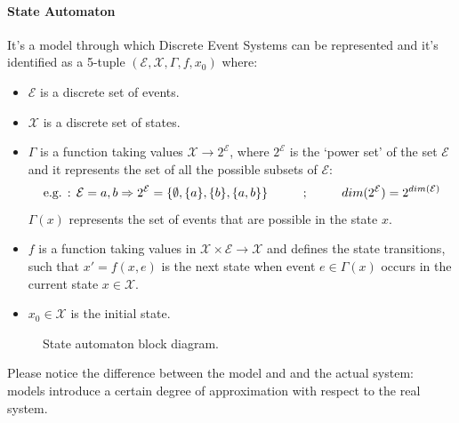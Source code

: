 \documentclass[12pt,a4paper]{article}
\begin{document}
\paragraph{State Automaton} It’s a model through which Discrete Event Systems can be represented and it’s identified as a 5-tuple $(\mathcal{E},\mathcal{X},\Gamma,f,x_0)$ where:
\begin{itemize}
\item $\mathcal{E}$ is a discrete set of events.
\item $\mathcal{X}$ is a discrete set of states.
\item $\Gamma$ is a function taking values $\mathcal{X}\rightarrow 2^\mathcal{E}$, where $2^\mathcal{E}$ is the `power set’ of the set $\mathcal{E}$ and it represents the set of all the possible subsets of $\mathcal{E}$:
$$
\text{e.g. : }\mathcal{E}={a,b} \Rightarrow 2^\mathcal{E}=\{\emptyset, \{a\}, \{b\}, \{a,b\}\} \text{\hspace{1 cm};\hspace{1 cm}} dim(2^\mathcal{E}) = 2^{dim(\mathcal{E})}
$$
$\Gamma(x)$ represents the set of events that are possible in the state $x$. 
\item $f$ is a function taking values in $\mathcal{X}\times\mathcal{E}\rightarrow\mathcal{X}$ and defines the state transitions, such that $x' = f(x,e)$ is the next state when event $e\in\Gamma(x)$ occurs in the current state $x\in\mathcal{X}$.
\item $x_0\in\mathcal{X}$ is the initial state.
\end{itemize}
\begin{figure}[H]
	\begin{center}
	\end{center}
	\caption{State automaton block diagram.}
	\label{fig:stateAut}
\end{figure}
Please notice the difference between the model and and the actual system: models introduce a certain degree of approximation with respect to the real system.
\end{document}
